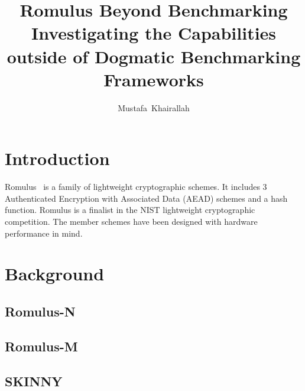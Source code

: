 \documentclass[10pt,a4paper]{article}
\author{Mustafa~Khairallah}
\title{Romulus Beyond Benchmarking\\\Large Investigating the Capabilities outside of Dogmatic Benchmarking Frameworks}
\newcommand{\romulus}{{\sf Romulus}\xspace}
\begin{document}
\maketitle
\section{Introduction}

\romulus~\cite{} is a family of lightweight cryptographic schemes. It includes 3 Authenticated Encryption with Associated Data (AEAD) schemes and a hash function. \romulus is a finalist in the NIST lightweight cryptographic competition. The member schemes have been designed with hardware performance in mind.

\section{Background}

\subsection{Romulus-N}

\subsection{Romulus-M}

\subsection{SKINNY}
\end{document}
